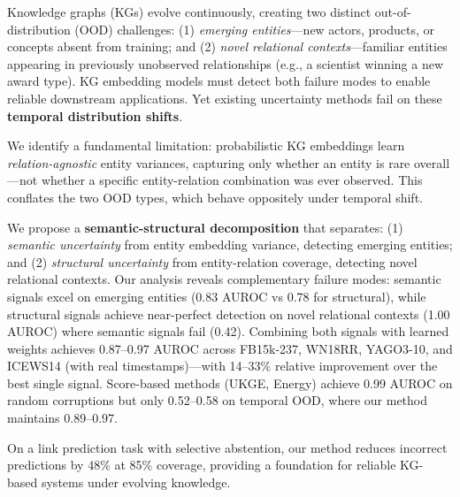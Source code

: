 
Knowledge graphs (KGs) evolve continuously, creating two distinct out-of-distribution (OOD) challenges: (1) \emph{emerging entities}---new actors, products, or concepts absent from training; and (2) \emph{novel relational contexts}---familiar entities appearing in previously unobserved relationships (e.g., a scientist winning a new award type).
KG embedding models must detect both failure modes to enable reliable downstream applications.
Yet existing uncertainty methods fail on these \textbf{temporal distribution shifts}.

We identify a fundamental limitation: probabilistic KG embeddings learn \emph{relation-agnostic} entity variances, capturing only whether an entity is rare overall---not whether a specific entity-relation combination was ever observed.
This conflates the two OOD types, which behave oppositely under temporal shift.

We propose a \textbf{semantic-structural decomposition} that separates: (1) \emph{semantic uncertainty} from entity embedding variance, detecting emerging entities; and (2) \emph{structural uncertainty} from entity-relation coverage, detecting novel relational contexts.
Our analysis reveals complementary failure modes: semantic signals excel on emerging entities (0.83 AUROC vs 0.78 for structural), while structural signals achieve near-perfect detection on novel relational contexts (1.00 AUROC) where semantic signals fail (0.42).
Combining both signals with learned weights achieves 0.87--0.97 AUROC across FB15k-237, WN18RR, YAGO3-10, and ICEWS14 (with real timestamps)---with 14--33\% relative improvement over the best single signal. Score-based methods (UKGE, Energy) achieve 0.99 AUROC on random corruptions but only 0.52--0.58 on temporal OOD, where our method maintains 0.89--0.97.

On a link prediction task with selective abstention, our method reduces incorrect predictions by 48\% at 85\% coverage, providing a foundation for reliable KG-based systems under evolving knowledge.
